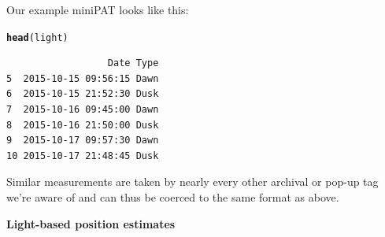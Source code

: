 \documentclass{article}\usepackage[]{graphicx}\usepackage[]{color}
\makeatletter
\newcommand{\hlstd}[1]{\textcolor[rgb]{0.345,0.345,0.345}{#1}}%
\newcommand{\hlkwd}[1]{\textcolor[rgb]{0.737,0.353,0.396}{\textbf{#1}}}%
\newenvironment{kframe}{%
 \def\at@end@of@kframe{}%
 \ifinner\ifhmode%
  \def\at@end@of@kframe{\end{minipage}}%
  \begin{minipage}{\columnwidth}%
 \fi\fi%
 \def\FrameCommand##1{\hskip\@totalleftmargin \hskip-\fboxsep
 \colorbox{shadecolor}{##1}\hskip-\fboxsep
     \hskip-\linewidth \hskip-\@totalleftmargin \hskip\columnwidth}%
 \MakeFramed {\advance\hsize-\width
   \@totalleftmargin\z@ \linewidth\hsize
   \@setminipage}}%
 {\par\unskip\endMakeFramed%
 \at@end@of@kframe}
\newenvironment{knitrout}{}{} %
\makeatother
\begin{document}
Our example miniPAT looks like this:

\begin{knitrout}\small
{}\color{fgcolor}\begin{kframe}
\begin{alltt}
\hlkwd{head}\hlstd{(light)}
\end{alltt}
\begin{verbatim}
                  Date Type
5  2015-10-15 09:56:15 Dawn
6  2015-10-15 21:52:30 Dusk
7  2015-10-16 09:45:00 Dawn
8  2015-10-16 21:50:00 Dusk
9  2015-10-17 09:57:30 Dawn
10 2015-10-17 21:48:45 Dusk
\end{verbatim}
\end{kframe}
\end{knitrout}

Similar measurements are taken by nearly every other archival or pop-up tag we're aware of and can thus be coerced to the same format as above.

\vspace{2mm}
\noindent \textbf{Light-based position estimates}
\end{document}
